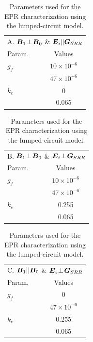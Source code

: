 \begin{table}[htp]
\centering
\caption{Parameters used for the EPR characterization using the lumped-circuit model.}
\begin{tabular}{l|c}
\multicolumn{2}{c}{{\Large A.} $\boldsymbol{B}_{1}\!\perp\!\boldsymbol{B}_{0}$ \& $\boldsymbol{E}_{i}||\boldsymbol{G}_{SRR}$} \\
\multicolumn{1}{l|}{Param.} & \multicolumn{1}{c}{Values} \\ \hline \hline
\multicolumn{1}{l|}{$g_f$} & \multicolumn{1}{c}{$10\times 10^{-6}$} \\
\rowcolor[rgb]{0.937,0.937,0.937}  
\multicolumn{1}{l|}{$g_r$} & \multicolumn{1}{c}{$47\times 10^{-6}$} \\
\multicolumn{1}{l|}{$k_c$} & \multicolumn{1}{c}{0} \\
\rowcolor[rgb]{0.937,0.937,0.937}  
\multicolumn{1}{l|}{$k_L$} & \multicolumn{1}{c}{0.065}\\
\end{tabular}
\begin{tabular}{ll}
\multicolumn{2}{c}{{\Large B.} $\boldsymbol{B}_{1}\!\perp\!\boldsymbol{B}_{0}$ \& $\boldsymbol{E}_{i}\!\perp\!\boldsymbol{G}_{SRR}$} \\
\multicolumn{1}{l|}{Param.} & \multicolumn{1}{c}{Values} \\ \hline\hline
\multicolumn{1}{l|}{$g_f$} & \multicolumn{1}{c}{$10\times 10^{-6}$} \\
\rowcolor[rgb]{0.937,0.937,0.937}  
\multicolumn{1}{l|}{$g_r$} & \multicolumn{1}{c}{$47\times 10^{-6}$} \\
\multicolumn{1}{l|}{$k_c$} & \multicolumn{1}{c}{0.255} \\
\rowcolor[rgb]{0.937,0.937,0.937}  
\multicolumn{1}{l|}{$k_L$} & \multicolumn{1}{c}{0.065}
\end{tabular}
\begin{tabular}{ll}
\multicolumn{2}{c}{{\Large C.} $\boldsymbol{B}_{1}||\boldsymbol{B}_{0}$ \& $\boldsymbol{E}_{i}\!\perp\!\boldsymbol{G}_{SRR}$} \\
\multicolumn{1}{l|}{Param.} & \multicolumn{1}{c}{Values} \\ \hline\hline
\multicolumn{1}{l|}{$g_f$} & \multicolumn{1}{c}{0} \\
\rowcolor[rgb]{0.937,0.937,0.937}  
\multicolumn{1}{l|}{$g_r$} & \multicolumn{1}{c}{$47\times 10^{-6}$} \\
\multicolumn{1}{l|}{$k_c$} & \multicolumn{1}{c}{0.255} \\
\rowcolor[rgb]{0.937,0.937,0.937}  
\multicolumn{1}{l|}{$k_L$} & \multicolumn{1}{c}{0.065} 
\end{tabular}\label{ch3-table:parameters}
\end{table}

